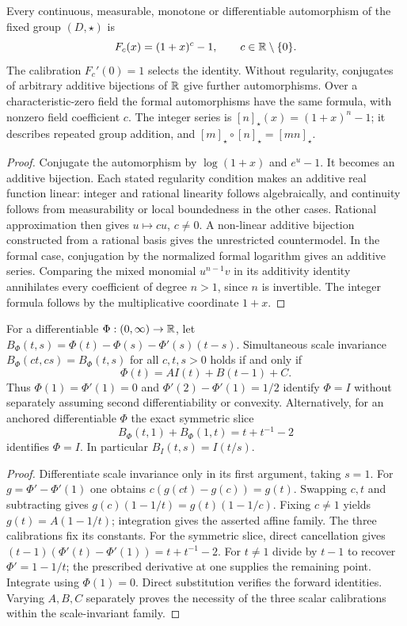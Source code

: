 \begin{proposition}
\label{final:C3-automorphisms}
Every continuous, measurable, monotone or differentiable automorphism
of the fixed group $(D,\star)$ is
\[
 F_c(x)=(1+x)^c-1,\qquad c\in\mathbb R\setminus\{0\}.
\]
The calibration $F_c'(0)=1$ selects the identity. Without regularity,
conjugates of arbitrary additive bijections of $\mathbb R$ give further
automorphisms. Over a characteristic-zero field the formal
automorphisms have the same formula, with nonzero field coefficient
$c$. The integer series is
$[n]_\star(x)=(1+x)^n-1$; it describes repeated group addition,
and $[m]_\star\circ[n]_\star=[mn]_\star$.
\end{proposition}
\begin{proof}
Conjugate the automorphism by $\log(1+x)$ and $e^u-1$. It becomes
an additive bijection. Each stated regularity condition makes an
additive real function linear: integer and rational linearity follows
algebraically, and continuity follows from measurability or local
boundedness in the other cases. Rational approximation then gives
$u\mapsto cu$, $c\ne0$. A non-linear additive bijection constructed
from a rational basis gives the unrestricted countermodel.
In the formal case, conjugation by the normalized formal logarithm
gives an additive series. Comparing the mixed monomial $u^{n-1}v$
in its additivity identity annihilates every coefficient of degree
$n>1$, since $n$ is invertible. The integer formula follows by the
multiplicative coordinate $1+x$.
\end{proof}

\begin{theorem}
\label{final:C4}
For a differentiable $\Phi:(0,\infty)\to\mathbb R$, let
$B_\Phi(t,s)=\Phi(t)-\Phi(s)-\Phi'(s)(t-s)$.
Simultaneous scale invariance $B_\Phi(ct,cs)=B_\Phi(t,s)$ for all
$c,t,s>0$ holds if and only if
\[
 \Phi(t)=A I(t)+B(t-1)+C.
\]
Thus $\Phi(1)=\Phi'(1)=0$ and
$\Phi'(2)-\Phi'(1)=1/2$ identify $\Phi=I$ without separately
assuming second differentiability or convexity. Alternatively,
for an anchored differentiable $\Phi$ the exact symmetric slice
\[
 B_\Phi(t,1)+B_\Phi(1,t)=t+t^{-1}-2
\]
identifies $\Phi=I$. In particular $B_I(t,s)=I(t/s)$.
\end{theorem}
\begin{proof}
Differentiate scale invariance only in its first argument, taking
$s=1$. For $g=\Phi'-\Phi'(1)$ one obtains
$c(g(ct)-g(c))=g(t)$. Swapping $c,t$ and subtracting gives
$g(c)(1-1/t)=g(t)(1-1/c)$. Fixing $c\ne1$ yields
$g(t)=A(1-1/t)$; integration gives the asserted affine family.
The three calibrations fix its constants. For the symmetric slice,
direct cancellation gives
$(t-1)(\Phi'(t)-\Phi'(1))=t+t^{-1}-2$.
For $t\ne1$ divide by $t-1$ to recover $\Phi'=1-1/t$;
the prescribed derivative at one supplies the remaining point.
Integrate using $\Phi(1)=0$. Direct substitution verifies the forward
identities. Varying $A,B,C$ separately proves the necessity of the
three scalar calibrations within the scale-invariant family.
\end{proof}


